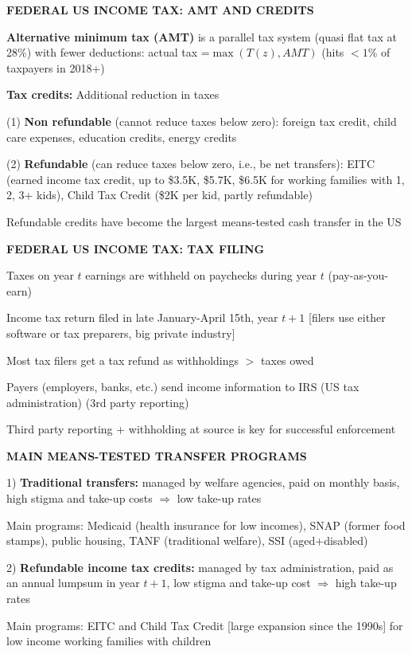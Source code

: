 \documentclass[landscape]{slides}
\begin{document}
\begin{slide}

\end{slide}


\begin{slide}
\begin{center}
{\bf FEDERAL US INCOME TAX: AMT AND CREDITS}
\end{center}

{\bf Alternative minimum tax (AMT)} is a parallel tax system
(quasi flat tax at 28\%) with fewer deductions: actual tax =$\max
(T(z),AMT)$ (hits $<1\%$ of taxpayers in 2018+)

{\bf Tax credits:} Additional reduction in taxes

(1) {\bf Non refundable} (cannot reduce taxes below zero): foreign
tax credit, child care expenses, education credits, energy credits

(2) {\bf Refundable} (can reduce taxes below zero, i.e., be net
transfers): EITC (earned income tax credit, up to \$3.5K, \$5.7K, \$6.5K for working
families with 1, 2, 3+ kids), Child Tax Credit (\$2K per kid, partly
refundable)

Refundable credits have become the largest means-tested cash transfer
in the US
\end{slide}

\begin{slide}
\begin{center}
{\bf FEDERAL US INCOME TAX: TAX FILING}
\end{center}
Taxes on year $t$ earnings are withheld on paychecks during year
$t$ (pay-as-you-earn)

Income tax return filed in late January-April 15th, year $t+1$ [filers use
either software or tax preparers, big private industry]

Most tax filers get a tax refund as withholdings $>$ taxes
owed

Payers (employers, banks, etc.) send income information to IRS (US tax administration)
(3rd party reporting)

Third party reporting + withholding at source is key for successful
enforcement

\end{slide}

\begin{slide}
\begin{center}
{\bf MAIN MEANS-TESTED TRANSFER PROGRAMS}
\end{center}
1) {\bf Traditional transfers:} managed by welfare agencies, paid
on monthly basis, high stigma and take-up costs $\Rightarrow$ low
take-up rates

Main programs: Medicaid (health insurance for low incomes), SNAP
(former food stamps), public housing, TANF (traditional welfare), SSI
(aged+disabled)

2) {\bf Refundable income tax credits:} managed by tax
administration, paid as an annual lumpsum in year $t+1$, low
stigma and take-up cost $\Rightarrow$  high take-up rates

Main programs: EITC and Child Tax Credit [large expansion since
the 1990s] for low income working families with children
\end{slide}
\end{document}
